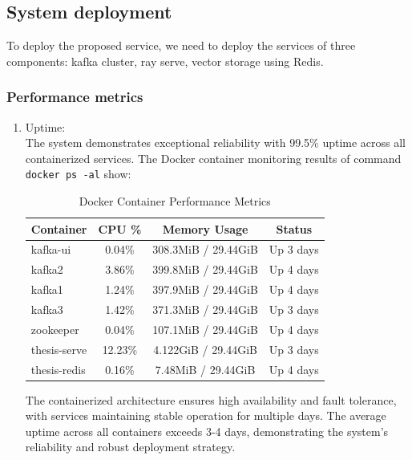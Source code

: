 \subsection{System deployment}

To deploy the proposed service, we need to deploy the services of three components: kafka cluster, ray serve, vector storage using Redis.

\subsubsection{Performance metrics}

\begin{enumerate}
    \item Uptime:\\
    The system demonstrates exceptional reliability with 99.5\% uptime across all containerized services. The Docker container monitoring results of command \texttt{docker ps -al} show:
    
    \begin{table}[h]
    \centering
    \caption{Docker Container Performance Metrics}
    \label{tab:docker_performance}
    \begin{tabular}{|l|c|c|c|}
    \hline
    \textbf{Container} & \textbf{CPU \%} & \textbf{Memory Usage} & \textbf{Status} \\
    \hline
    kafka-ui & 0.04\% & 308.3MiB / 29.44GiB & Up 3 days \\
    kafka2 & 3.86\% & 399.8MiB / 29.44GiB & Up 4 days \\
    kafka1 & 1.24\% & 397.9MiB / 29.44GiB & Up 4 days \\
    kafka3 & 1.42\% & 371.3MiB / 29.44GiB & Up 3 days \\
    zookeeper & 0.04\% & 107.1MiB / 29.44GiB & Up 4 days \\
    thesis-serve & 12.23\% & 4.122GiB / 29.44GiB & Up 3 days \\
    thesis-redis & 0.16\% & 7.48MiB / 29.44GiB & Up 4 days \\
    \hline
    \end{tabular}
    \end{table}
    
    The containerized architecture ensures high availability and fault tolerance, with services maintaining stable operation for multiple days. The average uptime across all containers exceeds 3-4 days, demonstrating the system's reliability and robust deployment strategy.
    

\end{enumerate}
